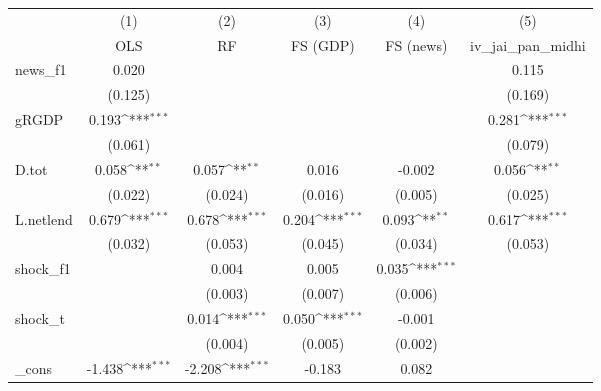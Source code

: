 {
\def\sym#1{\ifmmode^{#1}\else\(^{#1}\)\fi}
\begin{tabular}{l*{5}{c}}
\toprule
            &\multicolumn{1}{c}{(1)}&\multicolumn{1}{c}{(2)}&\multicolumn{1}{c}{(3)}&\multicolumn{1}{c}{(4)}&\multicolumn{1}{c}{(5)}\\
            &\multicolumn{1}{c}{OLS}&\multicolumn{1}{c}{RF}&\multicolumn{1}{c}{FS (GDP)}&\multicolumn{1}{c}{FS (news)}&\multicolumn{1}{c}{iv\_jai\_pan\_midhi}\\
\midrule
news\_f1     &       0.020         &                     &                     &                     &       0.115         \\
            &     (0.125)         &                     &                     &                     &     (0.169)         \\
\addlinespace
gRGDP       &       0.193\sym{***}&                     &                     &                     &       0.281\sym{***}\\
            &     (0.061)         &                     &                     &                     &     (0.079)         \\
\addlinespace
D.tot       &       0.058\sym{**} &       0.057\sym{**} &       0.016         &      -0.002         &       0.056\sym{**} \\
            &     (0.022)         &     (0.024)         &     (0.016)         &     (0.005)         &     (0.025)         \\
\addlinespace
L.netlend   &       0.679\sym{***}&       0.678\sym{***}&       0.204\sym{***}&       0.093\sym{**} &       0.617\sym{***}\\
            &     (0.032)         &     (0.053)         &     (0.045)         &     (0.034)         &     (0.053)         \\
\addlinespace
shock\_f1    &                     &       0.004         &       0.005         &       0.035\sym{***}&                     \\
            &                     &     (0.003)         &     (0.007)         &     (0.006)         &                     \\
\addlinespace
shock\_t     &                     &       0.014\sym{***}&       0.050\sym{***}&      -0.001         &                     \\
            &                     &     (0.004)         &     (0.005)         &     (0.002)         &                     \\
\addlinespace
\_cons      &      -1.438\sym{***}&      -2.208\sym{***}&      -0.183         &       0.082         &                     \\

\end{tabular}}
